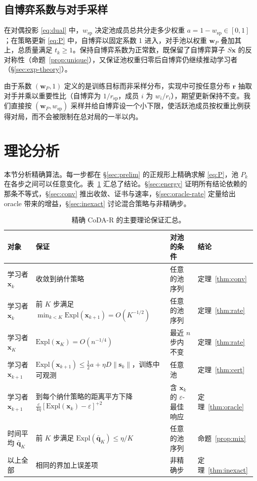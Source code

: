 \documentclass{article}
\theoremstyle{plain}
\theoremstyle{remark}
\newcommand{\Expl}{\mathrm{Expl}}
\newcommand{\bx}{{\bm{x}}}
\newcommand{\bw}{{\bm{w}}}
\newcommand{\bq}{{\bm{q}}}
\newcommand{\br}{{\bm{r}}}
\newcommand{\dx}{{\bm{s}}}
\newcommand{\wsp}{w_{\mathrm{sp}}}
\newcommand{\codar}{CoDA-R}
\begin{document}
\subsection{自博弈系数与对手采样}
\label{sec:share}

在对偶投影 \eqref{eq:dual} 中，$\wsp$ 决定池成员总共分走多少权重 $a=1-\wsp\in[0,1]$；在策略更新 \eqref{eq:P} 中，自博弈以固定系数 1 进入，对手池以权重 $\bw_P$ 叠加其上，总质量满足 $t_k\ge1$。保持自博弈系数为正常数，既保留了自博弈算子 $S\bx$ 的反对称性（命题~\ref{prop:unique}），又保证池权重归零后自博弈仍继续推动学习者（\S\ref{sec:exp-theory}）。

由于系数 $(\bw_P,1)$ 定义的是训练目标而非采样分布，实现中可按任意分布 $\br$ 抽取对手并乘以重要性比（自博弈为 $1/r_{\mathrm{sp}}$，成员 $i$ 为 $w_i/r_i$），期望更新保持不变。我们直接按 $(\bw_P,\wsp)$ 采样并给自博弈设一个小下限，使活跃池成员按权重比例获得对局，而不会被限制在总对局的一半以内。

\section{理论分析}
\label{sec:theory}

本节分析精确算法。每一步都在 \S\ref{sec:prelim} 的正规形上精确求解 \eqref{eq:P}，池 $P_k$ 在各步之间可以任意变化。表~\ref{tab:guarantees} 汇总了结论。\S\ref{sec:energy} 证明所有结论依赖的那条不等式，\S\ref{sec:conv} 推出收敛、证书与速率，\S\ref{sec:oracle-rate} 定量给出 oracle 带来的增益，\S\ref{sec:inexact} 讨论混合策略与非精确步。

\begin{table}[t]
\caption{精确 \codar{} 的主要理论保证汇总。}
\label{tab:guarantees}
\begin{center}
\footnotesize
\setlength{\tabcolsep}{4pt}
\begin{tabular}{p{2.3cm}p{5.6cm}p{3.6cm}l}
\toprule
对象 & 保证 & 对池的条件 & 结论 \\
\midrule
学习者 $\bx_k$ & 收敛到纳什策略 & 任意的池序列 & 定理~\ref{thm:conv} \\
学习者 $\bx_k$ & 前 $K$ 步满足 $\min_{k<K}\Expl(\bx_{k+1})=O(K^{-1/2})$ & 任意的池序列 & 定理~\ref{thm:rate} \\
学习者 $\bx_K$ & $\Expl(\bx_K)=O(n^{-1/4})$ & 最近 $n$ 步内不变 & 定理~\ref{thm:rate} \\
学习者 $\bx_{k+1}$ & $\Expl(\bx_{k+1})\le\tfrac12a+\eta D\|\dx_k\|$，训练中可观测 & 任意池 & 定理~\ref{thm:cert} \\
学习者 $\bx_{k+1}$ & 到每个纳什策略的距离平方下降 $\tfrac{c}{4\eta}[\Expl(\bx_k)-\varepsilon]^{+2}$ & 含 $\bx_k$ 的 $\varepsilon$-最佳响应 & 定理~\ref{thm:oracle} \\
时间平均 $\bar{\bq}_K$ & 前 $K$ 步满足 $\Expl(\bar{\bq}_K)\le\eta/K$ & 任意的池序列 & 命题~\ref{prop:mix} \\
以上全部 & 相同的界加上误差项 & 非精确步 & 定理~\ref{thm:inexact} \\
\bottomrule
\end{tabular}
\end{center}
\end{table}
\end{document}
